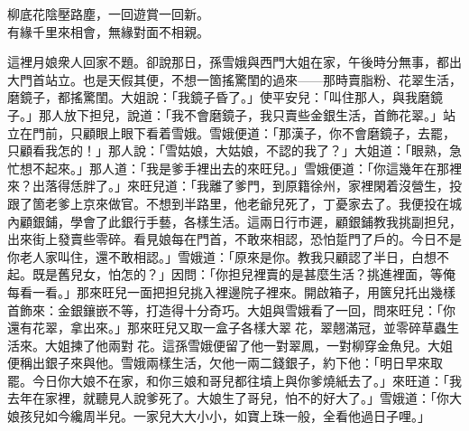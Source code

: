 \begin{myquote}
柳底花陰壓路塵，一回遊賞一回新。\\有緣千里來相會，無緣對面不相親。
\end{myquote}

這裡月娘衆人回家不題。卻說那日，孫雪娥與西門大姐在家，午後時分無事，都出大門首站立。也是天假其便，不想一箇搖驚閨的過來——那時賣脂粉、花翠生活，磨鏡子，都搖驚閨。大姐說：「我鏡子昏了。」使平安兒：「叫住那人，與我磨鏡子。」那人放下担兒，說道：「我不會磨鏡子，我只賣些金銀生活，首飾花翠。」站立在門前，只顧眼上眼下看着雪娥。雪娥便道：「那漢子，你不會磨鏡子，去罷，只顧看我怎的！」{}那人說：「雪姑娘，大姑娘，不認的我了？」大姐道：「眼熟，急忙想不起來。」那人道：「我是爹手裡出去的來旺兒。」雪娥便道：「你這幾年在那裡來？出落得恁胖了。」來旺兒道：「我離了爹門，到原籍徐州，家裡閑着沒營生，投跟了箇老爹上京來做官。不想到半路里，他老爺兒死了，丁憂家去了。我便投在城內顧銀鋪，學會了此銀行手藝，各樣生活。這兩日行市遲，顧銀鋪教我挑副担兒，出來街上發賣些零碎。看見娘每在門首，不敢來相認，恐怕踅門了戶的。今日不是你老人家叫住，還不敢相認。」雪娥道：「原來是你。教我只顧認了半日，白想不起。既是舊兒女，怕怎的？」因問：「你担兒裡賣的是甚麼生活？挑進裡面，等俺每看一看。」那來旺兒一面把担兒挑入裡邊院子裡來。開啟箱子，用篋兒托出幾樣首飾來：金銀鑲嵌不等，打造得十分奇巧。大姐與雪娥看了一回，問來旺兒：「你還有花翠，拿出來。」那來旺兒又取一盒子各樣大翠𩬆花，翠翹滿冠，並零碎草蟲生活來。大姐揀了他兩對𩬆花。這孫雪娥便留了他一對翠鳳，一對柳穿金魚兒。大姐便稱出銀子來與他。雪娥兩樣生活，欠他一兩二錢銀子，約下他：「明日早來取罷。今日你大娘不在家，和你三娘和哥兒都往墳上與你爹燒紙去了。」來旺道：「我去年在家裡，就聽見人說爹死了。大娘生了哥兒，怕不的好大了。」雪娥道：「你大娘孩兒如今纔周半兒。一家兒大大小小，如寶上珠一般，全看他過日子哩。」

